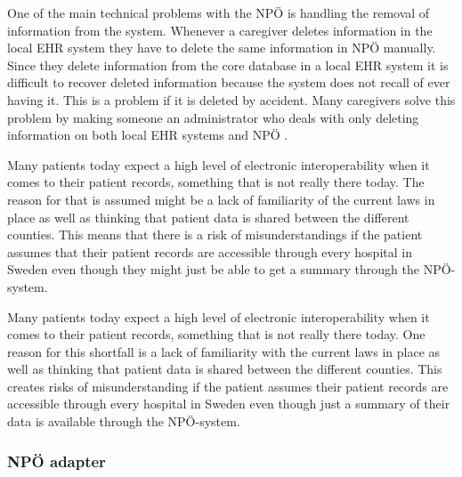 \documentclass[14pt]{article}
\begin{document}
One of the main technical problems with the NPÖ is handling the removal of information from the system. Whenever a caregiver deletes information in the local \gls{EHR} system they have to delete the same information in NPÖ manually. Since they delete information from the core database in a local \gls{EHR} system it is difficult to recover deleted information because the system does not recall of ever having it. This is a problem if it is deleted by accident. Many caregivers solve this problem by making someone an administrator who deals with only deleting information on both local \gls{EHR} systems and NPÖ  \cite{ViktorJernelov}.

Many patients today expect a high level of electronic \gls{interoperability} when it comes to their patient records\cite{EPJ2}, something that is not really there today. The reason for that is assumed might be a lack of familiarity of the current laws in place as well as thinking that patient data is shared between the different counties. This means that there is a risk of misunderstandings if the patient assumes that their patient records are accessible through every hospital in Sweden even though they might just be able to get a summary through the NPÖ-system.

Many patients today expect a high level of electronic \gls{interoperability} when it comes to their patient records\cite{EPJ2}, something that is not really there today. One reason for this shortfall is a lack of familiarity with the current laws in place as well as thinking that patient data is shared between the different counties. This creates risks of misunderstanding if the patient assumes their patient records are accessible through every hospital in Sweden even though just a summary of their data is available through the NPÖ-system.

\subsubsection{NPÖ adapter}

\end{document}
